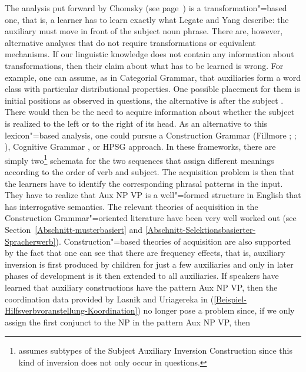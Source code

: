 \noindent
The analysis put forward by Chomsky (see page~\pageref{Seite-GB-Entscheidungsfragen-Englisch}) is a transformation"=based one, that is, a learner
has to learn exactly what Legate and Yang describe: the auxiliary must move in front of the subject noun phrase. There are, however, alternative analyses that
do not require transformations or equivalent mechanisms.
If our linguistic knowledge does not contain any information about transformations, then their claim about what has to be learned is wrong.
For example, one can assume, as in Categorial Grammar, that auxiliaries form a word class with particular distributional properties.
One possible placement for them is initial positions as observed in questions, the alternative is after the subject \citep[]{Villavicencio2002a}.
There would then be the need to acquire information about whether the subject is realized to the
left or to the right of its head. As an alternative to this lexicon"=based analysis,
one could pursue a Construction Grammar (Fillmore \citeyear[]{Fillmore88a};
\citeyear{Fillmore99a}; \citealp[]{KF99a}), Cognitive Grammar \citep[Chapter~9]{Dabrowska2004a}, or HPSG\indexhpsg \citep{GSag2000a-u,Sag2013a} approach.
In these frameworks, there are simply two\footnote{%
	\citet{Fillmore99a} assumes subtypes of the Subject Auxiliary Inversion Construction since this kind of inversion does not
	only occur in questions.
}
\largerpage
schemata for the two sequences that assign different meanings according to the order of verb and subject. The acquisition problem is then that the learners have
to identify the corresponding phrasal patterns in the input. They have to realize that Aux NP VP is a well"=formed structure in English that has interrogative
semantics.
The relevant theories of acquisition in the Construction Grammar"=oriented literature have been very well worked out (see Section~\ref{Abschnitt-musterbasiert} and
\ref{Abschnitt-Selektionsbasierter-Spracherwerb}). Construction"=based theories of acquisition are also supported by the fact that one can see that there are
frequency effects, that is, auxiliary inversion is first produced by children for just a few auxiliaries and only in later phases of development is it then extended to
all auxiliaries. If speakers have learned that auxiliary constructions have the pattern Aux NP VP, then the coordination data provided by Lasnik and Uriagereka in 
(\ref{Beispiel-Hilfsverbvoranstellung-Koordination}) no longer pose a problem since, if we only assign the first conjunct to the NP in the pattern Aux NP VP, then
